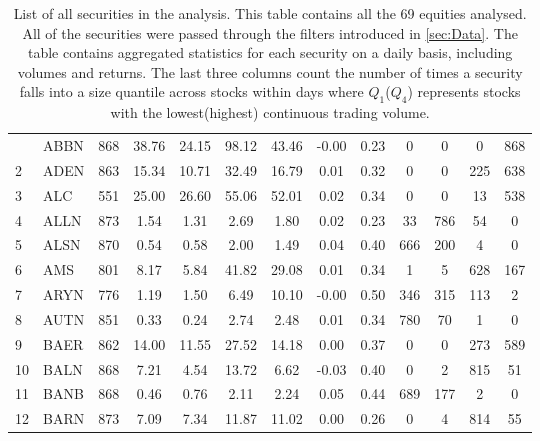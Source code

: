 \documentclass[11pt,a4paper]{article}
\begin{document}
\begin{doublespacing}
\begin{small}
\begin{longtable}{llc|cc|cc|cc|cccc}
                \bottomrule
                \caption[]{List of all securities in the analysis. This table contains all the 69 equities analysed. All of the securities were passed through the filters introduced in \cref{sec:Data}. The table contains aggregated statistics for each security on a daily basis, including volumes and returns. The last three columns count the number of times a security falls into a size quantile across stocks within days where $Q_1$($Q_4$) represents stocks with the lowest(highest) continuous trading volume.}
                \label{tab:Securities}
                \endlastfoot
                1   & ABBN  & 868 & 38.76  & 24.15    & 98.12  & 43.46    & -0.00 & 0.23     & 0     & 0     & 0     & 868   \\
                2   & ADEN  & 863 & 15.34  & 10.71    & 32.49  & 16.79    & 0.01  & 0.32     & 0     & 0     & 225   & 638   \\
                3   & ALC   & 551 & 25.00  & 26.60    & 55.06  & 52.01    & 0.02  & 0.34     & 0     & 0     & 13    & 538   \\
                4   & ALLN  & 873 & 1.54   & 1.31     & 2.69   & 1.80     & 0.02  & 0.23     & 33    & 786   & 54    & 0     \\
                5   & ALSN  & 870 & 0.54   & 0.58     & 2.00   & 1.49     & 0.04  & 0.40     & 666   & 200   & 4     & 0     \\
                6   & AMS   & 801 & 8.17   & 5.84     & 41.82  & 29.08    & 0.01  & 0.34     & 1     & 5     & 628   & 167   \\
                7   & ARYN  & 776 & 1.19   & 1.50     & 6.49   & 10.10    & -0.00 & 0.50     & 346   & 315   & 113   & 2     \\
                8   & AUTN  & 851 & 0.33   & 0.24     & 2.74   & 2.48     & 0.01  & 0.34     & 780   & 70    & 1     & 0     \\
                9   & BAER  & 862 & 14.00  & 11.55    & 27.52  & 14.18    & 0.00  & 0.37     & 0     & 0     & 273   & 589   \\
                10  & BALN  & 868 & 7.21   & 4.54     & 13.72  & 6.62     & -0.03 & 0.40     & 0     & 2     & 815   & 51    \\
                11  & BANB  & 868 & 0.46   & 0.76     & 2.11   & 2.24     & 0.05  & 0.44     & 689   & 177   & 2     & 0     \\
                12  & BARN  & 873 & 7.09   & 7.34     & 11.87  & 11.02    & 0.00  & 0.26     & 0     & 4     & 814   & 55    \\

\end{longtable}
\end{small}
\end{doublespacing}
\end{document}
